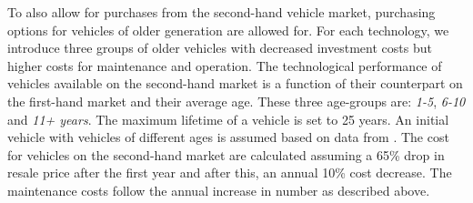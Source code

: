             To also allow for purchases from the second-hand vehicle market, purchasing options for vehicles of older generation are allowed for. For each technology, we introduce three groups of older vehicles with decreased investment costs but higher costs for maintenance and operation. The technological performance of vehicles available on the second-hand market is a function of their counterpart on the first-hand market and their average age. These three age-groups are: \textit{1-5}, \textit{6-10} and \textit{11\deleted{ }+ years}. The maximum lifetime of a vehicle is set to 25 years. An initial vehicle with vehicles of different ages is assumed based on data from \citep{dgt2023}. The cost for vehicles on the second-hand market are calculated assuming a 65\% drop in resale price after the first year and after this, an annual 10\% cost decrease. The maintenance costs follow the annual increase in number as described above. 
            
